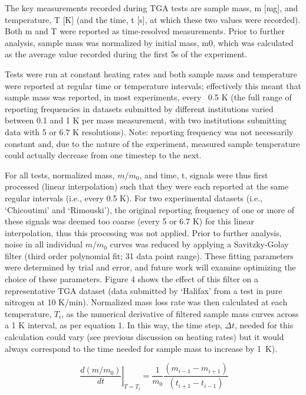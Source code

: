 \documentclass{book}
\begin{document}
The key measurements recorded during TGA tests are sample mass, m [mg], and temperature, T [K] (and the time, t [s], at which these two values were recorded).  Both m and T were reported as time-resolved measurements. Prior to further analysis, sample mass was normalized by initial mass, m0, which was calculated as the average value recorded during the first 5s of the experiment.

Tests were run at constant heating rates and both sample mass and temperature were reported at regular time or temperature intervals; effectively this meant that sample mass was reported, in most experiments, every ~0.5 K (the full range of reporting frequencies in datasets submitted by different institutions varied between 0.1 and 1 K per mass measurement, with two institutions submitting data with 5 or 6.7 K resolutions). Note: reporting frequency was not necessarily constant and, due to the nature of the experiment, measured sample temperature could actually decrease from one timestep to the next.

For all tests, normalized mass, $m/m_0$, and time, t, signals were thus first processed (linear interpolation) such that they were each reported at the same regular intervals (i.e., every 0.5 K). For two experimental datasets (i.e., ‘Chicoutimi’ and ‘Rimouski’), the original reporting frequency of one or more of these signals was deemed too coarse (every 5 or 6.7 K) for this linear interpolation, thus this processing was not applied.
Prior to further analysis, noise in all individual $m/m_0$ curves was reduced by applying a Savitzky-Golay filter (third order polynomial fit; 31 data point range). These fitting parameters were determined by trial and error, and future work will examine optimizing the choice of these parameters. Figure 4 shows the effect of this filter on a representative TGA dataset (data submitted by ‘Halifax’ from a test in pure nitrogen at 10 K/min).
Normalized mass loss rate was then calculated at each temperature, $T_i$, as the numerical derivative of filtered sample mass curves across a 1 K interval, as per equation 1. In this way, the time step, $\Delta t$, needed for this calculation could vary (see previous discussion on heating rates) but it would always correspond to the time needed for sample mass to increase by 1~K).

\begin{equation}
   \left.\ \frac{d\left(m/m_0\right)}{dt}\right|_{T=T_i}=\frac{1}{m_0}\frac{\left(m_{i-1}-m_{i+1}\right)}{\left(t_{i+1}-t_{i-1}\right)}
\end{equation}
\end{document}
